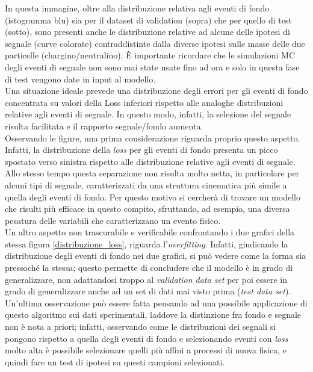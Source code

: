 In questa immagine, oltre alla distribuzione relativa agli eventi di fondo (istogramma blu) sia per il dataset di validation (sopra) che per quello di test (sotto), sono presenti anche le distribuzione relative ad alcune delle ipotesi di segnale (curve colorate) contraddistinte dalla diverse ipotesi sulle masse delle due particelle (chargino/neutralino). È importante ricordare che le simulazioni MC degli eventi di segnale non sono mai state usate fino ad ora e solo in questa fase di test vengono date in input al modello. \\
Una situazione ideale prevede una distribuzione degli errori per gli eventi di fondo concentrata su valori della Loss inferiori rispetto alle analoghe distribuzioni relative agli eventi di segnale. In questo modo, infatti, la selezione del segnale risulta facilitata e il rapporto segnale/fondo aumenta.\\
Osservando le figure, una prima considerazione riguarda proprio questo aspetto. Infatti, la distribuzione della \textit{loss} per gli eventi di fondo presenta un picco spostato verso sinistra rispetto alle distribuzione relative agli eventi di segnale. Allo stesso tempo questa separazione non risulta molto netta, in particolare per alcuni tipi di segnale, caratterizzati da una struttura cinematica più simile a quella degli eventi di fondo. Per questo motivo si cercherà di trovare un modello che risulti più efficace in questo compito, sfruttando, ad esempio, una diversa pesatura delle variabili che caratterizzano un evento fisico.\\
Un altro aspetto non trascurabile e verificabile confrontando i due grafici della stessa figura \ref{distribuzione_loss}, riguarda l'\textit{overfitting}. Infatti, giudicando la distribuzione degli eventi di fondo nei due grafici, si può vedere come la forma sia pressoché la stessa; questo permette di concludere che il modello è in grado di generalizzare, non adattandosi troppo al \textit{validation data set} per poi essere in grado di generalizzare anche ad un set di dati mai visto prima (\textit{test data set}).\\
Un'ultima osservazione può essere fatta pensando ad una possibile applicazione di questo algoritmo sui dati sperimentali, laddove la distinzione fra fondo e segnale non è nota a priori; infatti, osservando come le distribuzioni dei segnali si pongono rispetto a quella degli eventi di fondo e selezionando eventi con \textit{loss} molto alta è possibile selezionare quelli più affini a processi di nuova fisica, e quindi fare un test di ipotesi su questi campioni selezionati.

